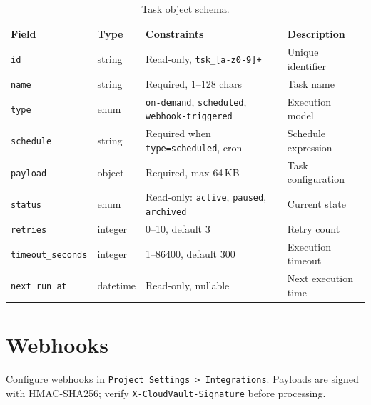 \documentclass[
    language=english,
    doctype=article,
    institution=none,
]{../../omnilatex}
\begin{document}
\begin{table}[htbp]
    \centering
    \caption{Task object schema.}
    \label{tab:task-schema}
    \begin{tabularx}{\textwidth}{@{}lllX@{}}
        \toprule
        \textbf{Field} & \textbf{Type} & \textbf{Constraints} & \textbf{Description} \\
        \midrule
        \texttt{id}               & string   & Read-only, \texttt{tsk\_[a-z0-9]+} & Unique identifier \\
        \texttt{name}             & string   & Required, 1--128 chars & Task name \\
        \texttt{type}             & enum     & \texttt{on-demand}, \texttt{scheduled}, \texttt{webhook-triggered} & Execution model \\
        \texttt{schedule}         & string   & Required when \texttt{type=scheduled}, cron & Schedule expression \\
        \texttt{payload}          & object   & Required, max 64\,KB & Task configuration \\
        \texttt{status}           & enum     & Read-only: \texttt{active}, \texttt{paused}, \texttt{archived} & Current state \\
        \texttt{retries}          & integer  & 0--10, default 3 & Retry count \\
        \texttt{timeout\_seconds} & integer  & 1--86400, default 300 & Execution timeout \\
        \texttt{next\_run\_at}    & datetime & Read-only, nullable & Next execution time \\
        \bottomrule
    \end{tabularx}
\end{table}

\section{Webhooks}
\label{sec:webhooks}
Configure webhooks in \texttt{Project Settings > Integrations}.
Payloads are signed with HMAC-SHA256; verify
\texttt{X-CloudVault-Signature} before processing.
\end{document}
